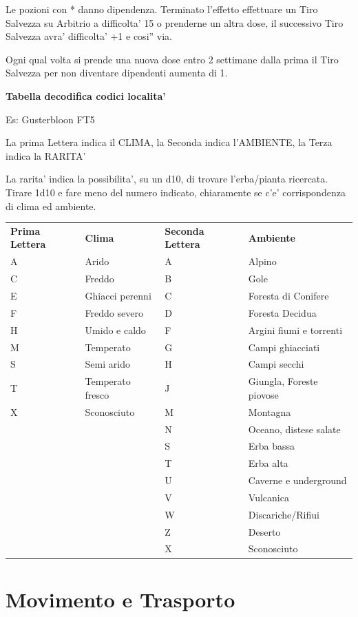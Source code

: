 \documentclass[a4paper,11pt,twoside,openany]{book}
\begin{document}
{		\medskip
		
		Le pozioni con {*} danno dipendenza. Terminato l'effetto effettuare
		un Tiro Salvezza su Arbitrio a difficolta' 15 o prenderne un altra
		dose, il successivo Tiro Salvezza avra' difficolta' +1 e cosi'' via.
		
		Ogni qual volta si prende una nuova dose entro 2 settimane dalla prima
		il Tiro Salvezza per non diventare dipendenti aumenta di 1.
		
		\bigskip
		
		\textbf{Tabella decodifica codici localita'}
		\smallskip
		
		Es: Gusterbloon FT5
		
		La prima Lettera indica il CLIMA, la Seconda indica l'AMBIENTE, la
		Terza indica la RARITA'
		
		La rarita' indica la possibilita', su un d10, di trovare l'erba/pianta
		ricercata. Tirare 1d10 e fare meno del numero indicato, chiaramente
		se c'e' corrispondenza di clima ed ambiente.
		\bigskip
		
		\begin{tabular}{llll}
			\toprule
			\textbf{Prima Lettera} & \textbf{Clima}&\textbf{Seconda Lettera} & \textbf{Ambiente}\tabularnewline
			A & Arido & A & Alpino\tabularnewline
			C & Freddo&B & Gole\tabularnewline
			E & Ghiacci perenni&C & Foresta di Conifere\tabularnewline
			F & Freddo severo&D & Foresta Decidua\tabularnewline
			H & Umido e caldo&F & Argini fiumi e torrenti\tabularnewline
			M & Temperato&G & Campi ghiacciati\tabularnewline
			S & Semi arido&H & Campi secchi\tabularnewline
			T & Temperato fresco&J & Giungla, Foreste piovose\tabularnewline
			X & Sconosciuto&M & Montagna\tabularnewline
			&&N & Oceano, distese salate\tabularnewline
			&&S & Erba bassa\tabularnewline
			&&T & Erba alta\tabularnewline
			&&U & Caverne e underground\tabularnewline
			&&V & Vulcanica\tabularnewline
			&&W & Discariche/Rifiui\tabularnewline
			&&Z & Deserto\tabularnewline
			&&X & Sconosciuto\tabularnewline
		\end{tabular}
		
		\pagebreak
		
		\section{Movimento e Trasporto}
		
		\label{movimento-e-trasporto}
		
		
		
}
\end{document}
